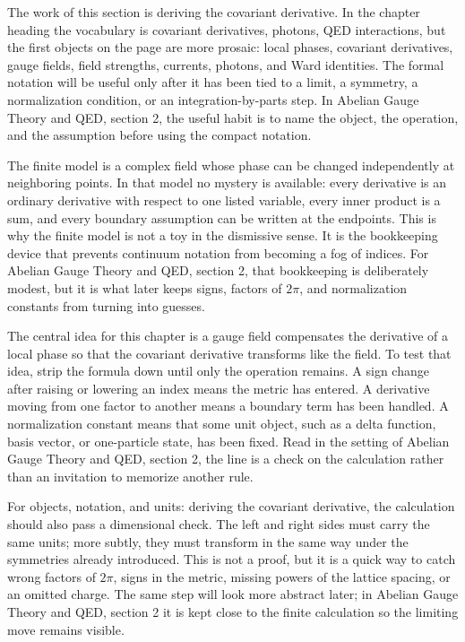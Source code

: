 The work of this section is deriving the covariant derivative.  In the chapter heading the vocabulary is covariant derivatives, photons, QED interactions, but the first objects on the page are more prosaic: local phases, covariant derivatives, gauge fields, field strengths, currents, photons, and Ward identities.  The formal notation will be useful only after it has been tied to a limit, a symmetry, a normalization condition, or an integration-by-parts step.  In Abelian Gauge Theory and QED, section 2, the useful habit is to name the object, the operation, and the assumption before using the compact notation.

The finite model is a complex field whose phase can be changed independently at neighboring points.  In that model no mystery is available: every derivative is an ordinary derivative with respect to one listed variable, every inner product is a sum, and every boundary assumption can be written at the endpoints.  This is why the finite model is not a toy in the dismissive sense.  It is the bookkeeping device that prevents continuum notation from becoming a fog of indices.  For Abelian Gauge Theory and QED, section 2, that bookkeeping is deliberately modest, but it is what later keeps signs, factors of \(2\pi\), and normalization constants from turning into guesses.

The central idea for this chapter is a gauge field compensates the derivative of a local phase so that the covariant derivative transforms like the field.  To test that idea, strip the formula down until only the operation remains.  A sign change after raising or lowering an index means the metric has entered.  A derivative moving from one factor to another means a boundary term has been handled.  A normalization constant means that some unit object, such as a delta function, basis vector, or one-particle state, has been fixed.  Read in the setting of Abelian Gauge Theory and QED, section 2, the line is a check on the calculation rather than an invitation to memorize another rule.

For objects, notation, and units: deriving the covariant derivative, the calculation should also pass a dimensional check.  The left and right sides must carry the same units; more subtly, they must transform in the same way under the symmetries already introduced.  This is not a proof, but it is a quick way to catch wrong factors of \(2\pi\), signs in the metric, missing powers of the lattice spacing, or an omitted charge.  The same step will look more abstract later; in Abelian Gauge Theory and QED, section 2 it is kept close to the finite calculation so the limiting move remains visible.

